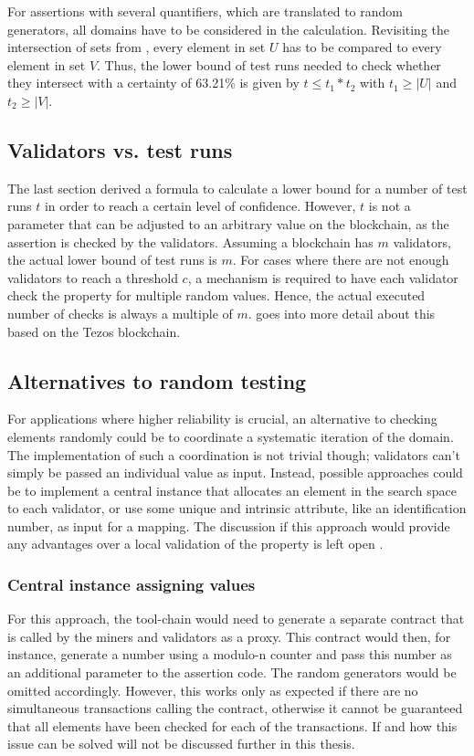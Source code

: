For assertions with several quantifiers, which are translated to random generators, all domains have to be considered in the calculation. Revisiting the intersection of sets from , every element in set $U$ has to be compared to every element in set $V$. Thus, the lower bound of test runs needed to check whether they intersect with a certainty of 63.21\% is given by $t \leq t_1 * t_2$ with $t_1 \geq |U|$ and $t_2 \geq |V|$.

\subsection{Validators vs. test runs}
The last section derived a formula to calculate a lower bound for a number of test runs $t$ in order to reach a certain level of confidence. However, $t$ is not a parameter that can be adjusted to an arbitrary value on the blockchain, as the assertion is checked by the validators. Assuming a blockchain has $m$ validators, the actual lower bound of test runs is $m$. For cases where there are not enough validators to reach a threshold $c$, a mechanism is required to have each validator check the property for multiple random values. Hence, the actual executed number of checks is always a multiple of $m$. \secref{} goes into more detail about this based on the Tezos blockchain. 

\subsection{Alternatives to random testing}\label{sec:alt_random}
For applications where higher reliability is crucial, an alternative to checking elements randomly could be to coordinate a systematic iteration of the domain. The implementation of such a coordination is not trivial though; validators can't simply be passed an individual value as input. Instead, possible approaches could be to implement a central instance that allocates an element in the search space to each validator, or use some unique and intrinsic attribute, like an identification number, as input for a mapping. The discussion if this approach would provide any advantages over a local validation of the property is left open .

\subsubsection{Central instance assigning values}
For this approach, the tool-chain would need to generate a separate contract that is called by the miners and validators as a proxy. This contract would then, for instance, generate a number using a modulo-n counter and pass this number as an additional parameter to the assertion code. The random generators would be omitted accordingly. However, this works only as expected if there are no simultaneous transactions calling the contract, otherwise it cannot be guaranteed that all elements have been checked for each of the transactions. If and how this issue can be solved will not be discussed further in this thesis.


